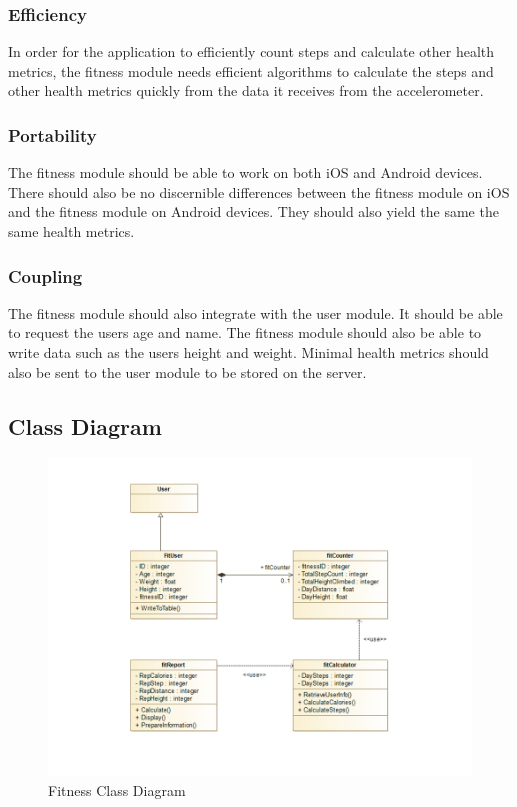 \subsubsection{Efficiency} 
In order for the application to efficiently count steps and calculate other health metrics, the fitness module needs efficient algorithms to calculate the steps and other health metrics quickly from the data it receives from the accelerometer.  

\subsubsection{Portability} 
The fitness module should be able to work on both iOS and Android devices. There should also be no discernible differences between the fitness module on iOS and the fitness module on Android devices. They should also yield the same the same health metrics. 

\subsubsection{Coupling} 
The fitness module should also integrate with the user module. It should be able to request the users age and name. The fitness module should also be able to write data such as the users height and weight. Minimal health metrics should also be sent to the user module to be stored on the server. 

\subsection{Class Diagram}
\begin{figure}[H]
	\centering
	\includegraphics[scale=0.44]{Fitness/Fitness_Class_Diagram.png}
	\caption{Fitness Class Diagram}
	\label{fig:Fitness_Class_Diagram}
\end{figure}


